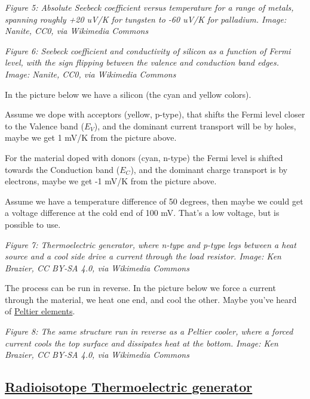 {
\centering
{}
}

\emph{Figure 5: Absolute Seebeck coefficient versus temperature for a
range of metals, spanning roughly +20 uV/K for tungsten to -60 uV/K for
palladium. Image: Nanite, CC0, via Wikimedia Commons}


{
\centering
{}
}

\emph{Figure 6: Seebeck coefficient and conductivity of silicon as a
function of Fermi level, with the sign flipping between the valence and
conduction band edges. Image: Nanite, CC0, via Wikimedia Commons}

In the picture below we have a silicon (the cyan and yellow colors).

Assume we dope with acceptors (yellow, p-type), that shifts the Fermi
level closer to the Valence band (\(E_V\)), and the dominant current
transport will be by holes, maybe we get 1 mV/K from the picture above.

For the material doped with donors (cyan, n-type) the Fermi level is
shifted towards the Conduction band (\(E_C\)), and the dominant charge
transport is by electrons, maybe we get -1 mV/K from the picture above.

Assume we have a temperature difference of 50 degrees, then maybe we
could get a voltage difference at the cold end of 100 mV. That's a low
voltage, but is possible to use.


{
\centering
{}
}

\emph{Figure 7: Thermoelectric generator, where n-type and p-type legs
between a heat source and a cool side drive a current through the load
resistor. Image: Ken Brazier, CC BY-SA 4.0, via Wikimedia Commons}

The process can be run in reverse. In the picture below we force a
current through the material, we heat one end, and cool the other. Maybe
you've heard of
\href{https://en.wikipedia.org/wiki/Thermoelectric_cooling}{Peltier
elements}.


{
\centering
{}
}

\emph{Figure 8: The same structure run in reverse as a Peltier cooler,
where a forced current cools the top surface and dissipates heat at the
bottom. Image: Ken Brazier, CC BY-SA 4.0, via Wikimedia Commons}

\subsection{\texorpdfstring{\href{https://en.wikipedia.org/wiki/Radioisotope_thermoelectric_generator}{Radioisotope
Thermoelectric
generator}}{Radioisotope Thermoelectric generator}}\label{radioisotope-thermoelectric-generator}

